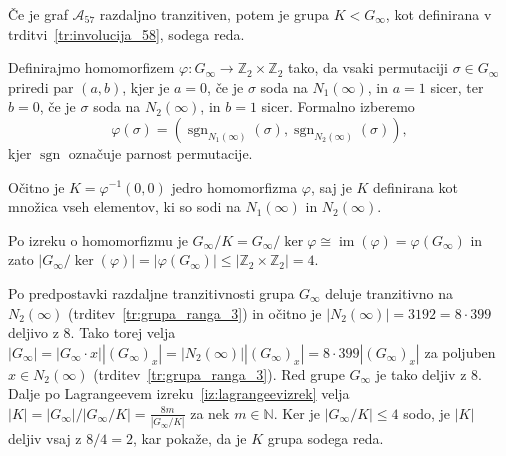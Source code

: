 \documentclass[fin1, tisk]{fmfdelo}
\newcommand{\asch}{\mathscr{A}_{57}}
\newcommand{\im}{\operatorname{im}}
\newcommand{\sgn}{\operatorname{sgn}}
\begin{document}
\begin{trditev}\label{tr:K_soda}
	Če je graf $\asch$ razdaljno tranzitiven, potem je
    grupa $K < G_{\infty}$, kot definirana v trditvi~\ref{tr:involucija_58}, sodega
    reda.
\end{trditev}
\begin{dokaz}
    Definirajmo homomorfizem $\varphi: G_{\infty} \to \mathbb{Z}_2 \times \mathbb{Z}_2$ tako, 
    da vsaki permutaciji $\sigma \in G_{\infty}$ priredi par $(a, b)$, kjer je $a = 0$, če je $\sigma$ soda na 
    $N_1(\infty)$, in $a = 1$ sicer, ter $b = 0$, če je $\sigma$ soda na $N_2(\infty)$, in $b = 1$ sicer.
    Formalno izberemo $$\varphi(\sigma) = (\sgn_{N_1(\infty)}(\sigma), \sgn_{N_2(\infty)}(\sigma)),$$
    kjer $\sgn$ označuje parnost permutacije.

    Očitno je $K = \varphi^{-1}(0, 0)$ jedro homomorfizma $\varphi$, 
    saj je $K$ definirana kot množica vseh elementov, ki so sodi na $N_1(\infty)$ in $N_2(\infty)$.

    Po izreku o homomorfizmu je 
    $G_{\infty}/K = G_{\infty}/\ker{\varphi} \cong \im(\varphi) = \varphi(G_{\infty})$ in zato
    $|G_{\infty}/\ker(\varphi)|= |\varphi(G_{\infty})| \leq |\mathbb{Z}_2 \times \mathbb{Z}_2| = 4$.

    Po predpostavki razdaljne tranzitivnosti grupa $G_{\infty}$ deluje tranzitivno na $N_2(\infty)$ (trditev~\ref{tr:grupa_ranga_3}) 
    in očitno je $|N_2(\infty)| = 3192 = 8\cdot 399$ deljivo z $8$.
    Tako torej velja 
    $|G_{\infty}| = |G_{\infty}\cdot x||(G_{\infty})_x| = |N_2(\infty)||(G_{\infty})_x| = 8\cdot 399 |(G_{\infty})_x|$ 
    za poljuben $x \in N_2(\infty)$ (trditev~\ref{tr:grupa_ranga_3}). Red grupe $G_{\infty}$ je tako deljiv z $8$.
    Dalje po Lagrangeevem izreku~\ref{iz:lagrangeevizrek} velja $|K| = |G_{\infty}| / |G_{\infty}/K| = \frac{8m}{|G_{\infty}/K|}$ za nek $m\in\mathbb{N}$. 
    Ker je $|G_{\infty}/K| \leq 4$ sodo, 
    je $|K|$ deljiv vsaj z $8/4 = 2$, kar pokaže, da je $K$ grupa sodega reda.
\end{dokaz}
\end{document}
